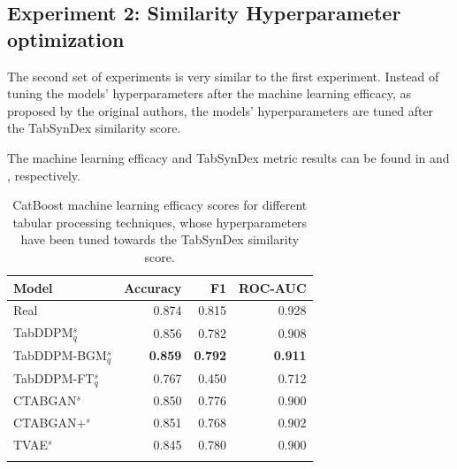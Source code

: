 \subsection{Experiment 2: Similarity Hyperparameter optimization}
\label{ch:Experiment-2}

The second set of experiments is very similar to the first experiment.
Instead of tuning the models' hyperparameters after the machine learning efficacy, as proposed by the original authors,
the models' hyperparameters are tuned after the TabSynDex similarity score.

The machine learning efficacy and TabSynDex metric results can be found in  and , respectively.



\begin{table}[h]
	\centering
	\begin{tabular}{lrrr}
		\toprule
		\textbf{Model}        & \textbf{Accuracy} & \textbf{F1}    & \textbf{ROC-AUC} \\
		\midrule
		Real                  & 0.874              & 0.815          & 0.928            \\
		TabDDPM$^{s}_{q}$     & 0.856              & 0.782          & 0.908            \\
		TabDDPM-BGM$^{s}_{q}$ & \textbf{0.859}     & \textbf{0.792} & \textbf{0.911}   \\
		TabDDPM-FT$^{s}_{q}$  & 0.767              & 0.450          & 0.712            \\
		CTABGAN$^{s}$         & 0.850              & 0.776          & 0.900            \\
		CTABGAN+$^{s}$        & 0.851              & 0.768          & 0.902            \\
		TVAE$^{s}$            & 0.845              & 0.780          & 0.900            \\
		\bottomrule
		\multicolumn{4}{c}{}\\[-0.6em]
	\end{tabular}
	\caption[Experiment 2 ML-Efficacy]{CatBoost machine learning efficacy scores for different tabular processing techniques, whose hyperparameters have been tuned towards the TabSynDex similarity score.}
	\label{tab:exp2-ml}
\end{table}

